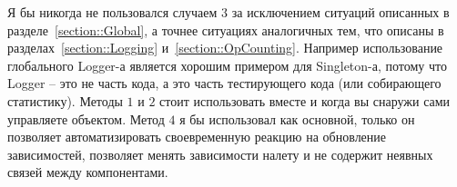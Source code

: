 Я бы никогда не пользовался случаем $3$ за исключением ситуаций описанных в разделе~\ref{section::Global}, а точнее ситуациях аналогичных тем, что описаны в разделах~\ref{section::Logging} и~\ref{section::OpCounting}.
Например использование глобального Logger-а является хорошим примером для Singleton-а, потому что Logger -- это не часть кода, а это часть тестирующего кода (или собирающего статистику).
Методы $1$ и $2$ стоит использовать вместе и когда вы снаружи сами управляете объектом.
Метод $4$ я бы использовал как основной, только он позволяет автоматизировать своевременную реакцию на обновление зависимостей, позволяет менять зависимости налету и не содержит неявных связей между компонентами.
